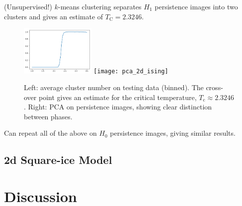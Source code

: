 \documentclass[11pt]{article}
\begin{document}
(Unsupervised!) $k$-means clustering separates $H_1$ persistence images into two clusters and gives an estimate of $T_\text{C}=2.3246$.

\begin{figure}[h]
    \centering
    \includegraphics[width=0.32\textwidth]{kmeans_avg_2d_ising}
    \texttt{[image: pca\_2d\_ising]}
    \caption{Left: average cluster number on testing data (binned). The cross-over point gives an estimate for the critical temperature, $T_\text{c}\approx 2.3246$. Right: PCA on persistence images, showing clear distinction between phases.}
\end{figure}

Can repeat all of the above on $H_0$ persistence images, giving similar results.

\subsection{2d Square-ice Model}

\section{Discussion}
\end{document}
